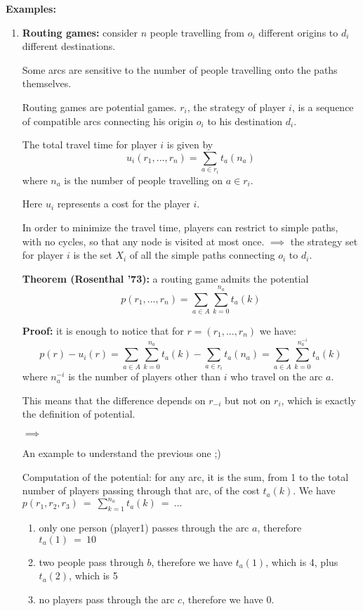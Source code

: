 \bigskip
\noindent \textbf{Examples:}
\begin{enumerate}
	
	\item \textbf{Routing games:} consider $n$ people travelling from $o_i$ different origins to $d_i$ different destinations. 

	\noindent Some arcs are sensitive to the number of people travelling onto 
	the paths themselves.
	
	\noindent Routing games are potential games. $r_i$, the strategy of player 
	$i$, is a sequence of compatible arcs connecting his origin $o_i$ to his destination $d_i$.
	
	\noindent The total travel time for player $i$ is given by
	\[
		u_i(r_1,...,r_n) = \sum_{a \in r_i}{t_a(n_a)}
	\]
	where $n_a$ is the number of people travelling on $a \in r_i$.
	
	\noindent Here $u_i$ represents a cost for the player $i$.
	
	\noindent In order to minimize the travel time, players can restrict to simple paths, with no cycles, so that any node is visited at most once. $\implies$ the strategy set for player $i$ is the set 
	$X_i$ of all the simple paths connecting $o_i$ to $d_i$.
	
	\bigskip
	\noindent \textbf{Theorem (Rosenthal '73):} a routing game admits the potential
	\[
		p(r_1,...,r_n) = \sum_{a \in A}{\sum_{k=0}^{n_a}t_a(k)}
	\]
	
	\noindent \textbf{Proof:} it is enough to notice that for $r = 
	(r_1,...,r_n)$ we have:
	\[
		p(r) - u_i(r) = \sum_{a \in A}{\sum_{k=0}^{n_a}t_a(k)} - 
		\sum_{a \in r_i}{t_a(n_a)} = \sum_{a \in A}{\sum_{k=0}^{n_a^{-i}}t_a(k)}
	\]
	where $n_a^{-i}$ is the number of players other than $i$ who travel on the arc $a$.
	
	\noindent This means that the difference depends on $r_{-i}$ but 
	not on $r_i$, which is exactly the definition of potential.

	\bigskip
	\noindent $\implies$
		
	\noindent An example to understand the previous one ;)
		
	\noindent Computation of the potential: for any arc, it is the sum, 
	from 1 to the total number of players passing through that arc, of the 
	cost $t_a(k)$. We have $p(r_1,r_2,r_3)~=~\sum_{k=1}^{n_a}{t_a(k)~=~...}$
	\begin{enumerate}
		\item only one person (player1) passes through the arc $a$, 
			therefore\\ $t_a(1)~=~10$
		\item two people pass through $b$, therefore we have $t_a(1)$, 
			which is 4, plus $t_a(2)$, which is 5
		\item no players pass through the arc $c$, therefore we have 0.
	\end{enumerate}
		

\end{enumerate}
